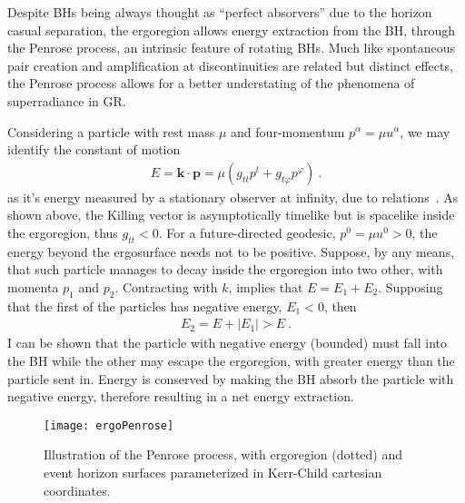 Despite BHs being always thought as ``perfect absorvers'' due to the horizon casual separation, the ergoregion allows energy extraction from the BH, through the Penrose process, an intrinsic feature of rotating BHs.
Much like spontaneous pair creation and amplification at discontinuities are related but distinct effects, the Penrose process allows for a better understating of the phenomena of superradiance in GR. 

Considering a particle with rest mass $\mu$ and four-momentum $p^\alpha = \mu u^\alpha$, we may identify the constant of motion 
\begin{align}
    E = \bm{k} \cdot \bm{p} = \mu ( g_{tt} p^t + g_{t\varphi} p^\varphi ) ~.
    \label{eq2:PenroseE0}
\end{align}
as it's energy measured by a stationary observer at infinity, due to relations~. As shown above, the Killing vector is asymptotically timelike but is spacelike inside the ergoregion, thus $g_{tt}<0$. For a future-directed geodesic, $p^0 = \mu u^0 > 0$, the energy beyond the ergosurface needs not to be positive. Suppose, by any means, that such particle manages to decay inside the ergoregion into two other, with momenta $p_1$ and $p_2$. Contracting with $k$, implies that $E = E_1+E_2$. Supposing that the first of the particles has negative energy, $E_1<0$, then 
\begin{align}
    E_2 = E + |E_1| > E ~.
    \label{eq2:PenroseE2}
\end{align}
I can be shown that the particle with negative energy (bounded) must fall into the BH while the other may escape the ergoregion, with greater energy than the particle sent in. Energy is conserved by making the BH absorb the particle with negative energy, therefore resulting in a net energy extraction.

\begin{figure}[h]
    \centering
    \vspace{0.2cm}
    \texttt{[image: ergoPenrose]}
    \caption{Illustration of the Penrose process, with ergoregion (dotted) and event horizon surfaces parameterized in Kerr-Child cartesian coordinates.}
    \label{fig2:penroseProcess}
\end{figure}

